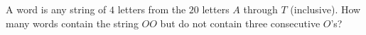 A word is any string of $4$ letters from the $20$ letters $A$ through $T$ (inclusive). How many words contain the string $OO$ but do not contain three consecutive $O$'s?

